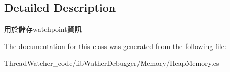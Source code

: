 \subsection{Detailed Description}
用於儲存watchpoint資訊 



The documentation for this class was generated from the following file\+:\begin{DoxyCompactItemize}
\item 
Thread\+Watcher\+\_\+code/lib\+Wather\+Debugger/\+Memory/Heap\+Memory.\+cs\end{DoxyCompactItemize}
